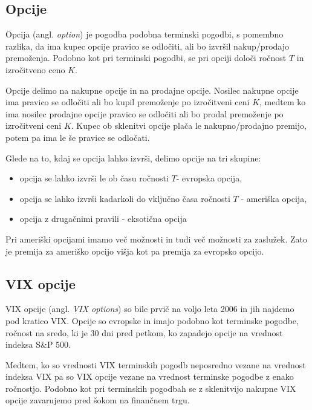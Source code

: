 \documentclass[12pt,a4paper]{amsart}
\theoremstyle{definition} %
\theoremstyle{plain} %
\newcommand{\geslo}[2]{\noindent\textbf{#1}\hspace*{3mm}\hangindent=\parindent\hangafter=1 #2}
\begin{document}
\subsection{Opcije}
Opcija (angl. \textit{option}) je pogodba podobna terminski pogodbi, s pomembno razlika, da ima kupec opcije pravico se odločiti, ali bo izvršil nakup/prodajo premoženja. Podobno kot pri terminski pogodbi, se pri opciji določi ročnost $T$ in izročitveno ceno $K$.\

Opcije delimo na nakupne opcije in na prodajne opcije. Nosilec nakupne opcije ima pravico se odločiti ali bo kupil premoženje po izročitveni ceni $K$, medtem ko ima nosilec prodajne opcije pravico se odločiti ali bo prodal premoženje po izročitveni ceni $K$.\newline
Kupec ob sklenitvi opcije plača le nakupno/prodajno premijo, potem pa ima le še pravice se odločati.\

Glede na to, kdaj se opcija lahko izvrši, delimo opcije na tri skupine:
\begin{itemize}
\item opcija se lahko izvrši le ob času ročnosti $T$- evropska opcija,
\item opcija se lahko izvrši kadarkoli do vključno časa ročnosti $T$ - ameriška opcija,
\item opcija z drugačnimi pravili - eksotična opcija
\end{itemize}
Pri ameriški opcijami imamo več možnosti in tudi več možnosti za zaslužek. Zato je premija za ameriško opcijo višja kot pa premija za evropsko opcijo.
\subsection{VIX opcije}
VIX opcije (angl. \textit{VIX options}) so bile prvič na voljo leta 2006 in jih najdemo pod kratico VIX. Opcije so evropske in imajo podobno kot terminske pogodbe, ročnost na sredo, ki je 30 dni pred petkom, ko zapadejo opcije na vrednost indeksa S\&P 500.\

Medtem, ko so vrednosti VIX terminskih pogodb neposredno vezane na vrednost indeksa VIX pa so VIX opcije vezane na vrednost terminske pogodbe z enako ročnostjo.
Podobno kot pri terminskih pogodbah se z sklenitvijo nakupne VIX opcije zavarujemo pred šokom na finančnem trgu.

%
%




\end{document}
